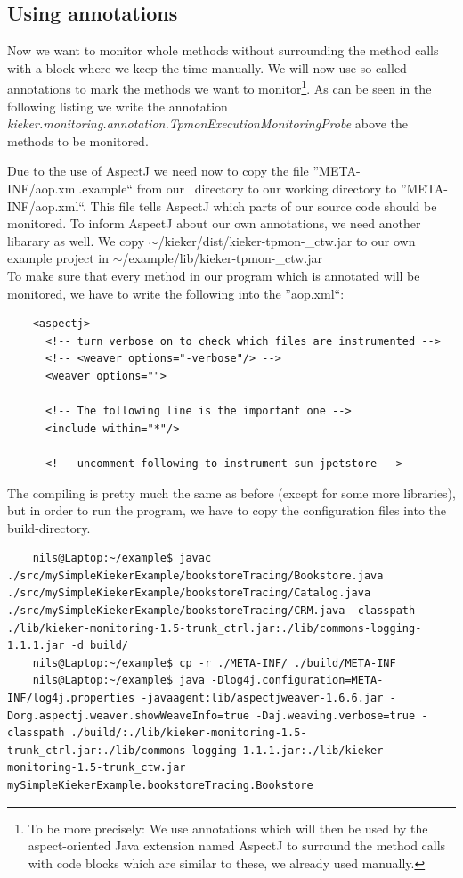 \documentclass[a4paper, oneside, 11pt]{scrartcl}
\begin{document}
    \subsection{Using annotations}
      Now we want to monitor whole methods without surrounding the method calls with a block where we keep the time manually. We will now use so called annotations to mark the methods we want to monitor\footnote{To be more precisely: We use annotations which will then be used by the aspect-oriented Java extension named AspectJ to surround the method calls with code blocks which are similar to these, we already used manually.}. As can be seen in the following listing we write the annotation \textit{kieker.monitoring.annotation.TpmonExecutionMonitoringProbe} above the methods to be monitored. 
      \setJavaCodeListing
      \lstset{caption=Bookstore.java, label=listing:Bookstore2.java}
      
      Due to the use of AspectJ we need now to copy the file ''META-INF/aop.xml.example`` from our \Kieker\ directory to our working directory to ''META-INF/aop.xml``. This file tells AspectJ which parts of our source code should be monitored. To inform AspectJ about our own annotations, we need another libarary as well. We copy $\sim$/kieker/dist/kieker-tpmon-\version\_ctw.jar to our own example project in $\sim$/example/lib/kieker-tpmon-\version\_ctw.jar\\
      To make sure that every method in our program which is annotated will be monitored, we have to write the following into the ''aop.xml``:
      \setXMLListing 
      \begin{lstlisting}
	<aspectj>
	  <!-- turn verbose on to check which files are instrumented -->
	  <!-- <weaver options="-verbose"/> -->
	  <weaver options="">
	      
	  <!-- The following line is the important one -->
	  <include within="*"/> 

	  <!-- uncomment following to instrument sun jpetstore -->
      \end{lstlisting}
      The compiling is pretty much the same as before (except for some more libraries), but in order to run the program, we have to copy the configuration files into the build-directory.
      \begin{lstlisting}
	nils@Laptop:~/example$ javac ./src/mySimpleKiekerExample/bookstoreTracing/Bookstore.java ./src/mySimpleKiekerExample/bookstoreTracing/Catalog.java ./src/mySimpleKiekerExample/bookstoreTracing/CRM.java -classpath ./lib/kieker-monitoring-1.5-trunk_ctrl.jar:./lib/commons-logging-1.1.1.jar -d build/
	nils@Laptop:~/example$ cp -r ./META-INF/ ./build/META-INF
	nils@Laptop:~/example$ java -Dlog4j.configuration=META-INF/log4j.properties -javaagent:lib/aspectjweaver-1.6.6.jar -Dorg.aspectj.weaver.showWeaveInfo=true -Daj.weaving.verbose=true -classpath ./build/:./lib/kieker-monitoring-1.5-trunk_ctrl.jar:./lib/commons-logging-1.1.1.jar:./lib/kieker-monitoring-1.5-trunk_ctw.jar mySimpleKiekerExample.bookstoreTracing.Bookstore
      \end{lstlisting}
\end{document}
